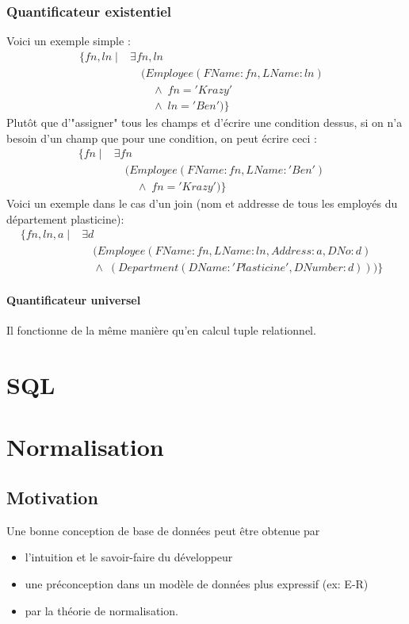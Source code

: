 \documentclass[a4paper]{article}
\begin{document}
  \subsubsection{Quantificateur existentiel}
  Voici un exemple simple :
  \begin{align*}
    \{fn, ln\; |\; &\exists fn, ln & \\
    &\quad(Employee(FName:fn, LName:ln)\\
    &\quad\quad\land\;fn='Krazy'\\
    &\quad\quad\land\; ln='Ben')\}
  \end{align*}
  Plutôt que d'"assigner" tous les champs et d'écrire une condition dessus,
  si on n'a besoin d'un champ que pour une condition, on peut écrire ceci :
  \begin{align*}
    \{fn\; |\; &\exists fn & \\
    &\quad(Employee(FName:fn, LName:'Ben')\\
    &\quad\quad\land\;fn='Krazy')\}
  \end{align*}
  Voici un exemple dans le cas d'un join (nom et addresse de tous les employés
  du département plasticine):
  \begin{align*}
    \{fn, ln, a\; |\; &\exists d & \\
    &\quad(Employee(FName:fn, LName:ln, Address:a, DNo:d)\\
    &\quad\land\;(Department(DName:'Plasticine', DNumber:d)))\}
  \end{align*}

  \paragraph{Quantificateur universel}
  Il fonctionne de la même manière qu'en calcul tuple relationnel.


\section{SQL}


\section{Normalisation}
\subsection{Motivation}
Une bonne conception de base de données peut être obtenue par
\begin{itemize}
  \item l'intuition et le savoir-faire du développeur
  \item une préconception dans un modèle de données plus expressif (ex: E-R)
  \item par la théorie de normalisation.
\end{itemize}
\end{document}
